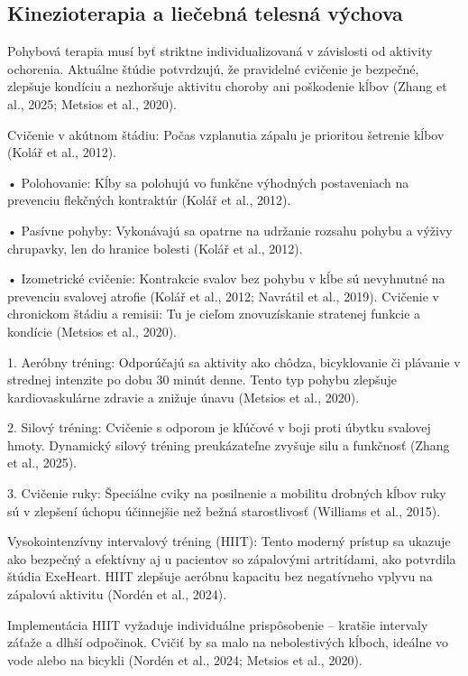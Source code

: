 \subsection{Kinezioterapia a liečebná telesná výchova}

Pohybová terapia musí byť striktne individualizovaná v závislosti od aktivity ochorenia. Aktuálne štúdie potvrdzujú, že pravidelné cvičenie je bezpečné, zlepšuje kondíciu a nezhoršuje aktivitu choroby ani poškodenie kĺbov (Zhang et al., 2025; Metsios et al., 2020). 

Cvičenie v akútnom štádiu: Počas vzplanutia zápalu je prioritou šetrenie kĺbov (Kolář et al., 2012). 

• Polohovanie: Kĺby sa polohujú vo funkčne výhodných postaveniach na prevenciu flekčných kontraktúr (Kolář et al., 2012). 

• Pasívne pohyby: Vykonávajú sa opatrne na udržanie rozsahu pohybu a výživy chrupavky, len do hranice bolesti (Kolář et al., 2012). 

• Izometrické cvičenie: Kontrakcie svalov bez pohybu v kĺbe sú nevyhnutné na prevenciu svalovej atrofie (Kolář et al., 2012; Navrátil et al., 2019). Cvičenie v chronickom štádiu a remisii: Tu je cieľom znovuzískanie stratenej funkcie a kondície (Metsios et al., 2020). 

1. Aeróbny tréning: Odporúčajú sa aktivity ako chôdza, bicyklovanie či plávanie v strednej intenzite po dobu 30 minút denne. Tento typ pohybu zlepšuje kardiovaskulárne zdravie a znižuje únavu (Metsios et al., 2020). 

2. Silový tréning: Cvičenie s odporom je kľúčové v boji proti úbytku svalovej hmoty. Dynamický silový tréning preukázateľne zvyšuje silu a funkčnosť (Zhang et al., 2025). 

3. Cvičenie ruky: Špeciálne cviky na posilnenie a mobilitu drobných kĺbov ruky sú v zlepšení úchopu účinnejšie než bežná starostlivosť (Williams et al., 2015). 

Vysokointenzívny intervalový tréning (HIIT): Tento moderný prístup sa ukazuje ako bezpečný a efektívny aj u pacientov so zápalovými artritídami, ako potvrdila štúdia ExeHeart. HIIT zlepšuje aeróbnu kapacitu bez negatívneho vplyvu na zápalovú aktivitu (Nordén et al., 2024). 

Implementácia HIIT vyžaduje individuálne prispôsobenie – kratšie intervaly záťaže a dlhší odpočinok. Cvičiť by sa malo na nebolestivých kĺboch, ideálne vo vode alebo na bicykli (Nordén et al., 2024; Metsios et al., 2020). 

